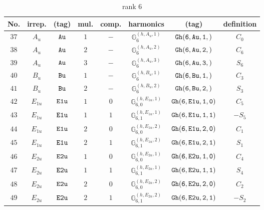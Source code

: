 \documentclass[fleqn,8pt]{jsarticle}
\begin{document}
\begin{table}[ht!]
\begin{center}
\caption{rank 6}
\renewcommand{\arraystretch}{1.3}
\begin{tabular}{cccccccc} \hline \hline
No. & irrep. & (tag) & mul. & comp. & harmonics & (tag) & definition \\ \hline
$ 37 $ & $ A_{u} $ & $ {\tt Au} $ & $ 1 $ & $ - $ & $ \mathbb{G}_{6}^{(h,A_{u},1)} $ & $ {\tt Gh(6,Au,1,)} $ & $ C_{0} $ \\
$ 38 $ & $ A_{u} $ & $ {\tt Au} $ & $ 2 $ & $ - $ & $ \mathbb{G}_{6}^{(h,A_{u},2)} $ & $ {\tt Gh(6,Au,2,)} $ & $ C_{6} $ \\
$ 39 $ & $ A_{u} $ & $ {\tt Au} $ & $ 3 $ & $ - $ & $ \mathbb{G}_{6}^{(h,A_{u},3)} $ & $ {\tt Gh(6,Au,3,)} $ & $ S_{6} $ \\
$ 40 $ & $ B_{u} $ & $ {\tt Bu} $ & $ 1 $ & $ - $ & $ \mathbb{G}_{6}^{(h,B_{u},1)} $ & $ {\tt Gh(6,Bu,1,)} $ & $ C_{3} $ \\
$ 41 $ & $ B_{u} $ & $ {\tt Bu} $ & $ 2 $ & $ - $ & $ \mathbb{G}_{6}^{(h,B_{u},2)} $ & $ {\tt Gh(6,Bu,2,)} $ & $ S_{3} $ \\
$ 42 $ & $ E_{1u} $ & $ {\tt E1u} $ & $ 1 $ & $ 0 $ & $ \mathbb{G}_{6,0}^{(h,E_{1u},1)} $ & $ {\tt Gh(6,E1u,1,0)} $ & $ C_{5} $ \\
$ 43 $ & $ E_{1u} $ & $ {\tt E1u} $ & $ 1 $ & $ 1 $ & $ \mathbb{G}_{6,1}^{(h,E_{1u},1)} $ & $ {\tt Gh(6,E1u,1,1)} $ & $ - S_{5} $ \\
$ 44 $ & $ E_{1u} $ & $ {\tt E1u} $ & $ 2 $ & $ 0 $ & $ \mathbb{G}_{6,0}^{(h,E_{1u},2)} $ & $ {\tt Gh(6,E1u,2,0)} $ & $ C_{1} $ \\
$ 45 $ & $ E_{1u} $ & $ {\tt E1u} $ & $ 2 $ & $ 1 $ & $ \mathbb{G}_{6,1}^{(h,E_{1u},2)} $ & $ {\tt Gh(6,E1u,2,1)} $ & $ S_{1} $ \\
$ 46 $ & $ E_{2u} $ & $ {\tt E2u} $ & $ 1 $ & $ 0 $ & $ \mathbb{G}_{6,0}^{(h,E_{2u},1)} $ & $ {\tt Gh(6,E2u,1,0)} $ & $ C_{4} $ \\
$ 47 $ & $ E_{2u} $ & $ {\tt E2u} $ & $ 1 $ & $ 1 $ & $ \mathbb{G}_{6,1}^{(h,E_{2u},1)} $ & $ {\tt Gh(6,E2u,1,1)} $ & $ S_{4} $ \\
$ 48 $ & $ E_{2u} $ & $ {\tt E2u} $ & $ 2 $ & $ 0 $ & $ \mathbb{G}_{6,0}^{(h,E_{2u},2)} $ & $ {\tt Gh(6,E2u,2,0)} $ & $ C_{2} $ \\
$ 49 $ & $ E_{2u} $ & $ {\tt E2u} $ & $ 2 $ & $ 1 $ & $ \mathbb{G}_{6,1}^{(h,E_{2u},2)} $ & $ {\tt Gh(6,E2u,2,1)} $ & $ - S_{2} $ \\
 \hline \hline
\end{tabular}
\end{center}
\end{table}
\end{document}
